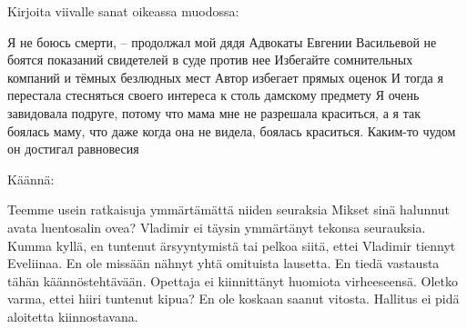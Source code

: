 
Kirjoita viivalle sanat oikeassa muodossa:

Я не боюсь смерти, -- продолжал мой дядя
Адвокаты Евгении Васильевой не боятся показаний свидетелей в суде против нее
Избегайте сомнительных компаний и тёмных безлюдных мест
Автор избегает прямых оценок
И тогда я перестала стесняться своего интереса к столь дамскому предмету
Я очень завидовала подруге, потому что мама мне не разрешала краситься, а я так боялась маму, что даже когда она не видела, боялась краситься.
Каким-то чудом он достигал равновесия

Käännä:


Teemme usein ratkaisuja ymmärtämättä niiden seuraksia
Mikset sinä halunnut avata luentosalin ovea?
Vladimir ei täysin ymmärtänyt tekonsa seurauksia.
Kumma kyllä, en tuntenut ärsyyntymistä tai pelkoa siitä, ettei Vladimir tiennyt Eveliinaa.
En ole missään nähnyt yhtä omituista lausetta.
En tiedä vastausta tähän käännöstehtävään.
Opettaja ei kiinnittänyt huomiota virheeseensä.
Oletko varma, ettei hiiri tuntenut kipua?
En ole koskaan saanut vitosta.
Hallitus ei pidä aloitetta kiinnostavana.














